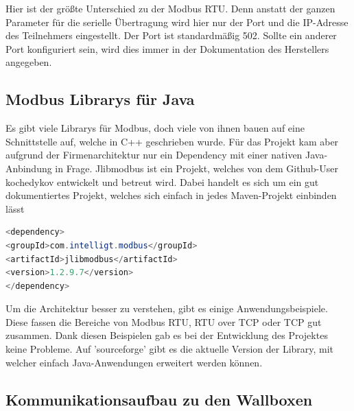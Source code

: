 Hier ist der größte Unterschied zu der Modbus RTU. Denn anstatt der ganzen Parameter für die serielle Übertragung wird hier nur der Port und die IP-Adresse des Teilnehmers eingestellt. Der Port ist standardmäßig 502. Sollte ein anderer Port konfiguriert sein, wird dies immer in der Dokumentation des Herstellers angegeben.



\subsection{Modbus Librarys für Java }



Es gibt viele Librarys für Modbus, doch viele von ihnen bauen auf eine Schnittstelle auf, welche in C++ geschrieben wurde. Für das Projekt kam aber aufgrund der Firmenarchitektur nur ein Dependency mit einer nativen Java-Anbindung in Frage. Jlibmodbus ist ein Projekt, welches von dem Github-User kochedykov entwickelt und betreut wird. Dabei handelt es sich um ein gut dokumentiertes Projekt, welches sich einfach in jedes Maven-Projekt einbinden lässt


\begin{lstlisting}[language=java,caption=Dependency in Pom.xml,label=lst:impl:foo]
<dependency>
<groupId>com.intelligt.modbus</groupId>
<artifactId>jlibmodbus</artifactId>
<version>1.2.9.7</version>
</dependency>
\end{lstlisting}



Um die Architektur besser zu verstehen, gibt es einige Anwendungsbeispiele. Diese fassen die Bereiche von Modbus RTU, RTU over TCP oder TCP gut zusammen. Dank diesen Beispielen gab es bei der Entwicklung des Projektes keine Probleme. Auf 'sourceforge' gibt es die aktuelle Version der Library, mit welcher einfach Java-Anwendungen erweitert werden können.


\subsection{Kommunikationsaufbau zu den Wallboxen }


